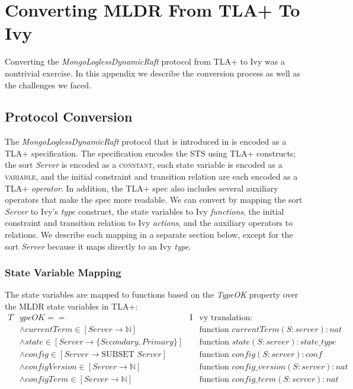 \documentclass[12pt]{article}
\newcommand{\tla}[1]{{\small\scshape #1}}
\begin{document}



\section{Converting MLDR From TLA+ To Ivy}

Converting the \textit{MongoLoglessDynamicRaft} protocol from TLA+ to Ivy was a nontrivial exercise.  In this appendix we describe the conversion process as well as the challenges we faced.

\subsection{Protocol Conversion}

The \textit{MongoLoglessDynamicRaft} protocol that is introduced in \cite{schultz2021design} is encoded as a TLA+ specification.  The specification encodes the STS using TLA+ constructs; the sort \textit{Server} is encoded as a \tla{constant}, each state variable is encoded as a \tla{variable}, and the initial constraint and transition relation are each encoded as a TLA+ \textit{operator}.  In addition, the TLA+ spec also includes several auxiliary operators that make the spec more readable.  We can convert by mapping the sort \textit{Server} to Ivy's \textit{type} construct, the state variables to Ivy \textit{functions}, the initial constraint and transition relation to Ivy \textit{actions}, and the auxiliary operators to relations.  We describe each mapping in a separate section below, except for the sort \textit{Server} because it maps directly to an Ivy \textit{type}.

\subsubsection{State Variable Mapping}

The state variables are mapped to functions based on the \textit{TypeOK} property over the MLDR state variables in TLA+:
\begin{align*}
  T&ypeOK ==& \text{I}&\text{vy translation:}\\
    &\land currentTerm \in [Server \to \mathbb{N}]& &\text{function } currentTerm(S:server) : nat\\
    &\land state \in [Server \to \{Secondary, Primary\}]& &\text{function } state(S:server) : state\_type\\
    &\land config \in [Server \to \text{SUBSET } Server]& &\text{function } config(S:server) : conf\\
    &\land configVersion \in [Server \to \mathbb{N}]& &\text{function } config\_version(S:server) : nat\\
    &\land configTerm \in [Server \to \mathbb{N}]& &\text{function } config\_term(S:server) : nat\\
\end{align*}
\end{document}
